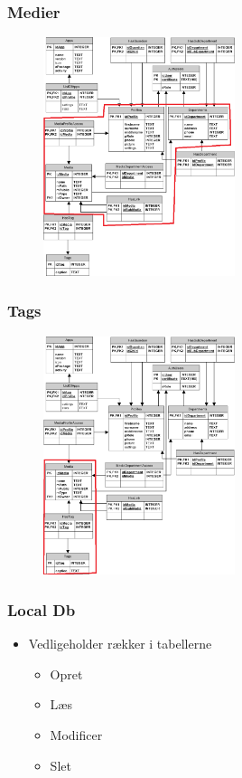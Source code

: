 \documentclass{beamer}
\begin{document}
\begin{frame}
	\frametitle{Medier}
	
	\begin{figure}[!h]
		\centering
			\includegraphics[width=0.5\textwidth]{dbMedia}
		\label{fig:Medier}
	\end{figure}
\end{frame}

\begin{frame}
	\frametitle{Tags}
	
	\begin{figure}[!h]
		\centering
			\includegraphics[width=0.5\textwidth]{dbTags}
		\label{fig:Tags}
	\end{figure}
\end{frame}

\begin{frame}
	\frametitle{Local Db}
	
	\begin{itemize}
		\item Vedligeholder r\ae{}kker i tabellerne
		\begin{itemize}
			\item Opret
			\item L\ae{}s
			\item Modificer
			\item Slet
		\end{itemize}
	\end{itemize}
\end{frame}
\end{document}
